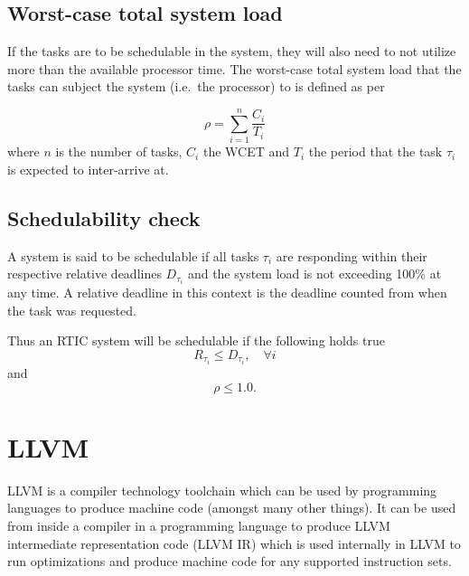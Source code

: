 \subsection{Worst-case total system load}
If the tasks are to be schedulable in the system, they will also need to not
utilize more than the available processor time. The worst-case total system
load that the tasks can subject the system (i.e.\ the processor) to is defined
as per \cite{hardrealtimecomputingsystems}

\begin{equation}
    \rho = \sum^{n}_{i=1} \frac{C_i}{T_i}
\end{equation}
where $n$ is the number of tasks, $C_i$ the WCET and $T_i$ the
period that the task $\tau_i$ is expected to inter-arrive at.

\subsection{Schedulability check}
A system is said to be schedulable if all tasks $\tau_i$ are responding within
their respective relative deadlines $D_{\tau_i}$ and the system load is not exceeding
100\% at any time. A relative deadline in this context is the deadline counted
from when the task was requested.

Thus an RTIC system will be schedulable if the following holds true
\begin{equation}
    R_{\tau_i} \leq D_{\tau_i}, \quad \forall i
\end{equation}
and
\begin{equation}
    \rho \leq 1.0.
\end{equation}


\section{LLVM}
LLVM is a compiler technology toolchain which can be used by programming
languages to produce machine code (amongst many other things). It can be used
from inside a compiler in a programming language to produce LLVM intermediate
representation code (LLVM IR) which is used internally in LLVM to run
optimizations and produce machine code for any supported instruction sets.

